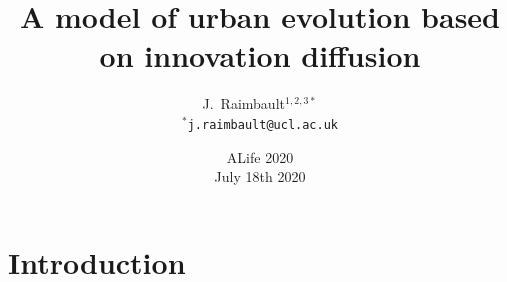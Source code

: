 



\title[A model of urban evolution]{A model of urban evolution based on innovation diffusion}
\author[Raimbault]{J.~Raimbault$^{1,2,3\ast}$\\\medskip
$^{\ast}$\texttt{j.raimbault@ucl.ac.uk}
}



\date[July 18th 2020]{ALife 2020\\
July 18th 2020
}

\frame{\maketitle}







\section{Introduction}




